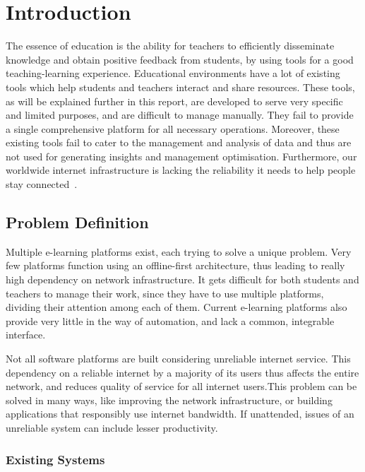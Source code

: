 \chapter{Introduction}


The essence of education is the ability for teachers to efficiently 
disseminate knowledge and obtain positive feedback from students, by 
using tools for a good teaching-learning experience. 
Educational environments have a lot of existing tools which help students 
and teachers interact and share resources. These tools, as will be explained 
further in this report, are developed to serve very specific and limited 
purposes, and are difficult to manage manually. They fail to provide a 
single comprehensive platform for all necessary operations. 
Moreover, these existing tools fail to cater to the management and analysis 
of data and thus are not used for generating insights and management optimisation. 
Furthermore, our worldwide internet infrastructure is lacking the reliability it 
needs to help people stay connected~\cite{WebF20}.

\section{Problem Definition}

Multiple e-learning platforms exist, each trying to solve a unique problem. 
Very few platforms function using an offline-first architecture, thus leading to 
really high dependency on network infrastructure. 
It gets difficult for both students and teachers to manage their work, 
since they have to use multiple platforms, dividing their attention among each of them. 
Current e-learning platforms also provide very little in the way of automation, 
and lack a common, integrable interface.

Not all software platforms are built considering unreliable internet service. 
This dependency on a reliable internet by a majority of its users thus affects the entire network, 
and reduces quality of service for all internet users.This problem can be solved in many ways, 
like improving the network infrastructure, or building applications that 
responsibly use internet bandwidth. If unattended, issues of an unreliable 
system can include lesser productivity.

\subsection{Existing Systems}

